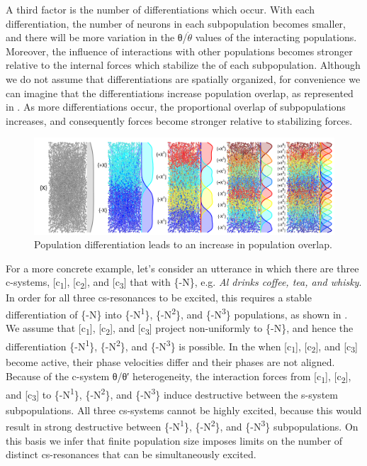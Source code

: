   A third factor is the number of differentiations which occur. With each differentiation, the number of neurons in each subpopulation becomes smaller, and there will be more variation in the θ/$\dot{\theta}$ values of the interacting populations. Moreover, the influence of interactions with other populations becomes stronger relative to the internal forces which stabilize the  of each subpopulation.  Although we do not assume that differentiations are spatially organized, for convenience we can imagine that the differentiations increase population overlap, as represented in {}. As more differentiations occur, the proportional overlap of subpopulations increases, and consequently  forces become stronger relative to stabilizing forces.

  
\begin{figure}
\includegraphics[width=\textwidth]{figures/Tilsen-img91.png}
\caption{Population differentiation leads to an increase in population overlap.}
\label{fig:4:41}
\end{figure}
 

  For a more concrete example, let's consider an utterance in which there are three c-systems, [c\textsubscript{1}], [c\textsubscript{2}], and [c\textsubscript{3}] that  with \{-N\}, e.g. \textit{Al drinks coffee, tea, and whisky}. In order for all three cs-resonances to be excited, this requires a stable differentiation of \{-N\} into \{-N\textsuperscript{1}\}, \{-N\textsuperscript{2}\}, and \{-N\textsuperscript{3}\} populations, as shown in {}. We assume that [c\textsubscript{1}], [c\textsubscript{2}], and [c\textsubscript{3}] project non-uniformly to \{-N\}, and hence the differentiation \{-N\textsuperscript{1}\}, \{-N\textsuperscript{2}\}, and \{-N\textsuperscript{3}\} is possible. In the  when [c\textsubscript{1}], [c\textsubscript{2}], and [c\textsubscript{3}] become active, their phase velocities differ and their phases are not aligned. Because of the c-system θ/θ′ heterogeneity, the interaction forces from [c\textsubscript{1}], [c\textsubscript{2}], and [c\textsubscript{3}] to \{-N\textsuperscript{1}\}, \{-N\textsuperscript{2}\}, and \{-N\textsuperscript{3}\} induce destructive  between the s-system subpopulations. All three cs-systems cannot be highly excited, because this would result in strong destructive  between \{-N\textsuperscript{1}\}, \{-N\textsuperscript{2}\}, and \{-N\textsuperscript{3}\} subpopulations. On this basis we infer that finite population size imposes limits on the number of distinct cs-resonances that can be simultaneously excited.

